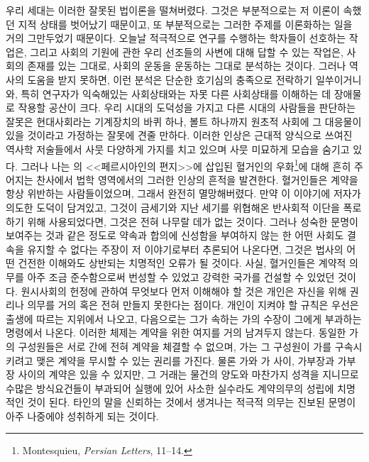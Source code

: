 우리 세대는 이러한 잘못된 법이론을 떨쳐버렸다.
그것은 부분적으로는 저 이론이 속했던 지적 상태를 벗어났기 때문이고,
또 부분적으로는 그러한 주제를 이론화하는 일을 거의 그만두었기 때문이다.
오늘날 적극적으로 연구를 수행하는 학자들이 선호하는 작업은,
그리고 사회의 기원에 관한 우리 선조들의 사변에 대해 답할 수 있는 작업은,
사회의 존재를 있는 그대로, 사회의 운동을 운동하는 그대로 분석하는 것이다.
그러나 역사의 도움을 받지 못하면,
이런 분석은 단순한 호기심의 충족으로 전락하기 일쑤이거니와,
특히
연구자가 익숙해있는 사회상태와는 자못 다른 사회상태를 이해하는 데
장애물로 작용할 공산이 크다.
우리 시대의 도덕성을 가지고 다른 시대의 사람들을 판단하는 잘못은
현대사회라는 기계장치의 바퀴 하나, 볼트 하나까지
원초적 사회에 그 대응물이 있을 것이라고 가정하는 잘못에 견줄 만하다.
이러한 인상은
근대적 양식으로 쓰여진 역사학 저술들에서
사뭇 다양하게 가지를 치고 있으며
사뭇 미묘하게 모습을 숨기고 있다.
그러나
나는
의
<<페르시아인의 편지>>에 삽입된
혈거인의 우화\footnote{%
  \latinmarks
  Montesquieu, \textit{Persian Letters}, 11--14.
}에 대해
흔히 주어지는 찬사에서
법학 영역에서의 그러한 인상의 흔적을 발견한다.
혈거인들은 계약을 항상 위반하는 사람들이었으며, 그래서 완전히 멸망해버렸다.
만약 이 이야기에 저자가 의도한 도덕이 담겨있고,
그것이
금세기와 지난 세기를 위협해온 반사회적 이단을
폭로하기 위해 사용되었다면,
그것은 전혀 나무랄 데가 없는 것이다.
그러나
성숙한 문명이 보여주는 것과 같은 정도로
약속과 합의에 신성함을 부여하지 않는 한
어떤 사회도 결속을 유지할 수 없다는
주장이
저 이야기로부터
추론되어 나온다면,
그것은 법사의 어떤 건전한 이해와도 상반되는 치명적인 오류가
될 것이다.
사실,
혈거인들은 계약적 의무를 아주 조금 준수함으로써
번성할 수 있었고 강력한 국가를 건설할 수 있었던 것이다.
원시사회의 헌정에 관하여
무엇보다 먼저 이해해야 할 것은
개인은 자신을 위해 권리나 의무를 거의 혹은 전혀 만들지 못한다는 점이다.
개인이 지켜야 할 규칙은 우선은 출생에 따르는 지위에서 나오고,
다음으로는 그가 속하는 가의 수장이 그에게 부과하는
명령에서 나온다.
이러한 체제는 계약을 위한 여지를 거의 남겨두지 않는다.
동일한 가의 구성원들은
서로 간에 전혀 계약을 체결할 수 없으며,
가는 그 구성원이 가를 구속시키려고 맺은 계약을
무시할 수 있는 권리를 가진다.
물론 가와 가 사이, 가부장과 가부장 사이의 계약은 있을 수 있지만,
그 거래는 물건의 양도와 마찬가지 성격을 지니므로
수많은 방식요건들이 부과되어
실행에 있어
사소한 실수라도 계약의무의 성립에 치명적인 것이 된다.
타인의 말을 신뢰하는 것에서 생겨나는 적극적 의무는
진보된 문명이 아주 나중에야 성취하게 되는 것이다.

